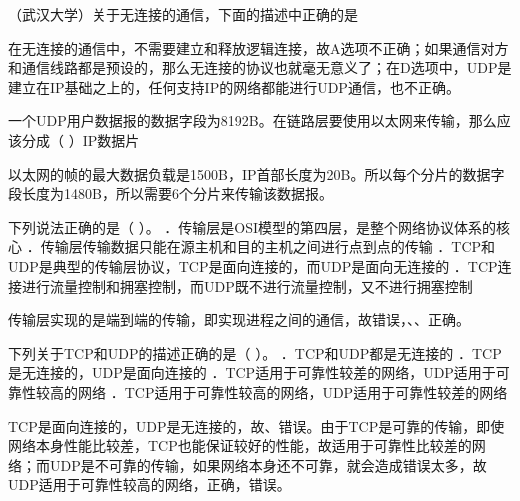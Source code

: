 \question （武汉大学）关于无连接的通信，下面的描述中正确的是
\par{}
\begin{solution}在无连接的通信中，不需要建立和释放逻辑连接，故A选项不正确；如果通信对方和通信线路都是预设的，那么无连接的协议也就毫无意义了；在D选项中，UDP是建立在IP基础之上的，任何支持IP的网络都能进行UDP通信，也不正确。
\end{solution}
\question 一个UDP用户数据报的数据字段为8192B。在链路层要使用以太网来传输，那么应该分成（
）IP数据片
\par{}
\begin{solution}以太网的帧的最大数据负载是1500B，IP首部长度为20B。所以每个分片的数据字段长度为1480B，所以需要6个分片来传输该数据报。
\end{solution}
\question 下列说法正确的是（ ）。
．传输层是OSI模型的第四层，是整个网络协议体系的核心
．传输层传输数据只能在源主机和目的主机之间进行点到点的传输
．TCP和UDP是典型的传输层协议，TCP是面向连接的，而UDP是面向无连接的
．TCP连接进行流量控制和拥塞控制，而UDP既不进行流量控制，又不进行拥塞控制
\par{}
\begin{solution}传输层实现的是端到端的传输，即实现进程之间的通信，故错误，、、正确。
\end{solution}
\question 下列关于TCP和UDP的描述正确的是（ ）。 ．TCP和UDP都是无连接的
．TCP是无连接的，UDP是面向连接的
．TCP适用于可靠性较差的网络，UDP适用于可靠性较高的网络
．TCP适用于可靠性较高的网络，UDP适用于可靠性较差的网络
\par{}
\begin{solution}TCP是面向连接的，UDP是无连接的，故、错误。由于TCP是可靠的传输，即使网络本身性能比较差，TCP也能保证较好的性能，故适用于可靠性比较差的网络；而UDP是不可靠的传输，如果网络本身还不可靠，就会造成错误太多，故UDP适用于可靠性较高的网络，正确，错误。
\end{solution}
